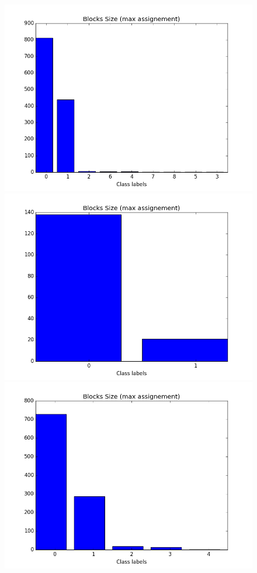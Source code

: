 \begin{figure}[ht]
	\endminipage
		\vspace{-0.28cm}
	\includegraphics[scale=0.27]{img/ilfm/1/figure_5}
	\endminipage
	\includegraphics[scale=0.27]{img/ilfm/2/figure_5} 
	\endminipage
	\includegraphics[scale=0.27]{img/ilfm/3/figure_5}

\end{figure}
